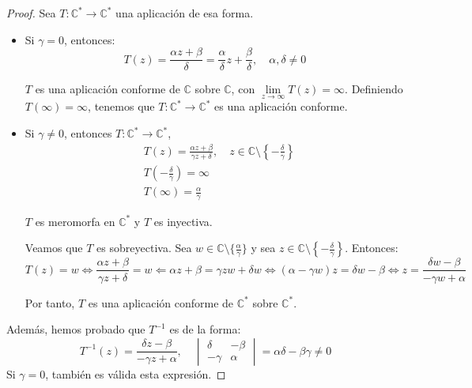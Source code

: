 \begin{proof}
    Sea $T: \mathbb{C}^\ast \to \mathbb{C}^\ast$ una aplicación de esa forma.
    \begin{itemize}
        \item Si $\gamma = 0$, entonces:
              $$T(z) = \frac{\alpha z + \beta}{\delta} = \frac{\alpha}{\delta}z + \frac{\beta}{\delta}, \quad \alpha, \delta \neq 0$$

              $T$ es una aplicación conforme de $\mathbb{C}$ sobre $\mathbb{C}$, con $\lim\limits_{z \to \infty} T(z) = \infty$.
              Definiendo $T(\infty) = \infty$, tenemos que $T: \mathbb{C}^\ast \to \mathbb{C}^\ast$ es una aplicación conforme.

        \item Si $\gamma \neq 0$, entonces $T: \mathbb{C}^\ast \to \mathbb{C}^\ast$,
              \begin{align*}
                   & T(z) = \frac{\alpha z + \beta}{\gamma z + \delta}, \quad z \in \mathbb{C} \setminus \left\{-\frac{\delta}{\gamma}\right\} \\
                   & T\left(-\frac{\delta}{\gamma}\right) = \infty                                                                             \\
                   & T(\infty) = \frac{\alpha}{\gamma}
              \end{align*}

              $T$ es meromorfa en $\mathbb{C}^\ast$ y $T$ es inyectiva.

              Veamos que $T$ es sobreyectiva.
              Sea $w \in \mathbb{C} \setminus \{\frac{\alpha}{\gamma}\}$ y sea $z \in \mathbb{C} \setminus \left\{-\frac{\delta}{\gamma}\right\}$.
              Entonces:
              $$T(z) = w \Leftrightarrow \frac{\alpha z + \beta}{\gamma z + \delta} = w \Leftarrow \alpha z + \beta = \gamma zw + \delta w \Leftrightarrow (\alpha - \gamma w)z = \delta w - \beta \Leftrightarrow z = \frac{\delta w - \beta}{-\gamma w + \alpha}$$

              Por tanto, $T$ es una aplicación conforme de $\mathbb{C}^\ast$ sobre $\mathbb{C}^\ast$.
    \end{itemize}

    Además, hemos probado que $T^{-1}$ es de la forma:
    $$T^{-1}(z) = \frac{\delta z - \beta}{-\gamma z + \alpha}, \quad \begin{vmatrix}
            \delta  & -\beta \\
            -\gamma & \alpha
        \end{vmatrix} = \alpha\delta - \beta\gamma \neq 0$$
    Si $\gamma = 0$, también es válida esta expresión.
\end{proof}


